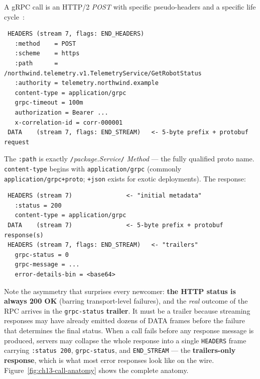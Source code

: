 A gRPC call is an HTTP/2 \emph{POST} with specific pseudo-headers and a specific
life cycle~\cite{grpcdocs,rfc9113}:

\begin{verbatim}
 HEADERS (stream 7, flags: END_HEADERS)
   :method    = POST
   :scheme    = https
   :path      = /northwind.telemetry.v1.TelemetryService/GetRobotStatus
   :authority = telemetry.northwind.example
   content-type = application/grpc
   grpc-timeout = 100m
   authorization = Bearer ...
   x-correlation-id = corr-000001
 DATA    (stream 7, flags: END_STREAM)   <- 5-byte prefix + protobuf request
\end{verbatim}

The \texttt{:path} is exactly \texttt{/}\emph{package.Service}\texttt{/}%
\emph{Method} --- the fully qualified proto name. \texttt{content-type} begins
with \texttt{application/grpc} (commonly \texttt{application/grpc+proto};
\texttt{+json} exists for exotic deployments). The response:

\begin{verbatim}
 HEADERS (stream 7)               <- "initial metadata"
   :status = 200
   content-type = application/grpc
 DATA    (stream 7)               <- 5-byte prefix + protobuf response(s)
 HEADERS (stream 7, flags: END_STREAM)   <- "trailers"
   grpc-status = 0
   grpc-message = ...
   error-details-bin = <base64>
\end{verbatim}

Note the asymmetry that surprises every newcomer: \textbf{the HTTP status is
always 200 OK} (barring transport-level failures), and the \emph{real} outcome
of the RPC arrives in the \texttt{grpc-status} \textbf{trailer}. It must be a
trailer because streaming responses may have already emitted dozens of DATA
frames before the failure that determines the final status. When a call fails
before any response message is produced, servers may collapse the whole response
into a single \texttt{HEADERS} frame carrying \texttt{:status 200},
\texttt{grpc-status}, and \texttt{END\_STREAM} --- the \textbf{trailers-only
response}, which is what most error responses look like on the wire.
Figure~\ref{fig:ch13-call-anatomy} shows the complete anatomy.

